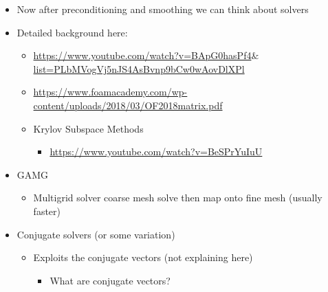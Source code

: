 \documentclass[12pt]{article}
\renewcommand{\_}{\kern-1.5pt\textunderscore\kern-1.5pt}
\begin{document}
\begin{itemize}
	\item Now after preconditioning and smoothing we can think about solvers\par

	\item Detailed background here:\par

\begin{itemize}
	\item \href{https://www.youtube.com/watch?v=BApG0hasPf4&list=PLbMVogVj5nJS4AsBvnp9bCw0wAovDlXPl}{https://www.youtube.com/watch?v=BApG0hasPf4$\&$ list=PLbMVogVj5nJS4AsBvnp9bCw0wAovDlXPl}\par

	\item \href{https://www.foamacademy.com/wp-content/uploads/2018/03/OF2018matrix.pdf}{https://www.foamacademy.com/wp-content/uploads/2018/03/OF2018matrix.pdf}\par

	\item Krylov Subspace Methods \par

\begin{itemize}
	\item \href{https://www.youtube.com/watch?v=B_eSPrYuIuU}{https://www.youtube.com/watch?v=B\_eSPrYuIuU}\par


\end{itemize}
\end{itemize}
	\item GAMG \par

\begin{itemize}
	\item Multigrid solver  coarse mesh solve then map onto fine mesh (usually faster)\par


\end{itemize}
	\item Conjugate solvers (or some variation)\par

\begin{itemize}
	\item Exploits the conjugate vectors (not explaining here)\par

\begin{itemize}
	\item What are conjugate vectors?\par


\end{itemize}
\end{itemize}
\end{itemize}
\end{document}
